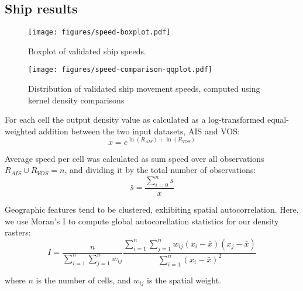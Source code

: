 

\subsection{Ship results}


\begin{figure}[htbp]
  \centering
  \texttt{[image: figures/speed-boxplot.pdf]}
  \caption{Boxplot of validated ship speeds.}
  \label{fig:vessel-speed-boxplot}
\end{figure}

\begin{figure}[htbp]
  \centering
  \texttt{[image: figures/speed-comparison-qqplot.pdf]}
  \caption{Distribution of validated ship movement speeds, computed using kernel density comparisons \cite{bowman1997applied}}
  \label{fig:vessel-speed-density}
\end{figure}


For each cell the output density value as calculated as a log-transformed equal-weighted addition between the two input datasets, AIS and VOS:
\begin{equation}
 x = e^{\ln(R_{AIS}) + \ln(R_{VOS})}
\end{equation}

Average speed per cell was calculated as sum speed over all observations $R_{AIS} \cup R_{VOS} = n$, and dividing it by the total number of observations: 
\begin{equation}
 \bar{s} = \frac{\sum\limits_{i=0}^n s}{x}
\end{equation}


Geographic features tend to be clustered, exhibiting spatial autocorrelation. Here, we use Moran's I to compute global autocorellation statistics for our density rasters:
\begin{equation}
I = \frac{n}{\sum_{i=1}^{n}\sum_{j=1}^{n}w_{ij}}
\frac{\sum_{i=1}^{n}\sum_{j=1}^{n}w_{ij}(x_i-\bar{x})(x_j-\bar{x})}{\sum_{i=1}^{n}(x_i - \bar{x})^2}
\end{equation}

where $n$ is the number of cells, and $w_{ij}$ is the spatial weight.


